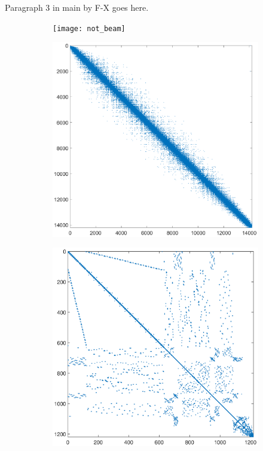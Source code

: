 \documentclass{elsarticle}
\begin{document}
		Paragraph 3 in main by F-X goes here.
		\begin{figure}
			\centering
			\begin{subfigure}{0.3\textwidth}
				\texttt{[image: not\_beam]}
				\caption{}
				\label{fig:mat_beam}
			\end{subfigure}
			\enskip
			\begin{subfigure}{0.3\textwidth}
				\includegraphics[width=\textwidth,trim={410 40 400 40},clip]{2d_airfoil.eps}
				\caption{}
				\label{fig:mat_fan}
			\end{subfigure}
			\enskip
			\begin{subfigure}{0.3\textwidth}
				\includegraphics[width=\textwidth,trim={410 40 400 40},clip]{2d_fan.eps}

\end{subfigure}
\end{figure}
\end{document}
